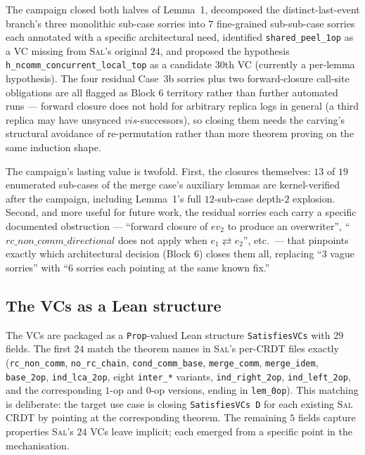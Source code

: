 \documentclass[11pt,a4paper]{article}
\theoremstyle{definition}
\theoremstyle{remark}
\newcommand{\ev}{\mathit{ev}}
\newcommand{\commute}{\mathrel{\rightleftarrows}}
\newcommand{\Sal}{\textsc{Sal}}
\begin{document}
The campaign closed both halves of Lemma~1, decomposed the
distinct-last-event branch's three monolithic sub-case sorries
into $7$ fine-grained sub-sub-case sorries each annotated with a
specific architectural need, identified \texttt{shared\_peel\_1op}
as a VC missing from \Sal{}'s original $24$, and proposed the
hypothesis \texttt{h\_ncomm\_concurrent\_local\_top} as a candidate
$30$th VC (currently a per-lemma hypothesis). The four residual
Case~3b sorries plus two forward-closure call-site obligations are
all flagged as Block 6 territory rather than further automated
runs --- forward closure does not hold for arbitrary replica logs
in general (a third replica may have unsynced
$\mathit{vis}$-successors), so closing them needs the carving's
structural avoidance of re-permutation rather than more theorem
proving on the same induction shape.

The campaign's lasting value is twofold. First, the closures
themselves: $13$ of $19$ enumerated sub-cases of the merge case's
auxiliary lemmas are kernel-verified after the campaign, including
Lemma~1's full $12$-sub-case depth-$2$ explosion. Second, and more
useful for future work, the residual sorries each carry a specific
documented obstruction --- ``forward closure of $\ev_2$ to produce
an overwriter'', ``$\mathit{rc\_non\_comm\_directional}$ does not
apply when $e_1 \commute e_2$'', etc.\ --- that pinpoints exactly
which architectural decision (Block 6) closes them all, replacing
``$3$ vague sorries'' with ``$6$ sorries each pointing at the same
known fix.''

\subsection{The VCs as a Lean structure}
\label{sec:satisfies-vcs}

The VCs are packaged as a \texttt{Prop}-valued Lean structure
\texttt{SatisfiesVCs} with $29$ fields. The first $24$
match the theorem names in \Sal{}'s per-CRDT files exactly
(\texttt{rc\_non\_comm}, \texttt{no\_rc\_chain},
\texttt{cond\_comm\_base}, \texttt{merge\_comm}, \texttt{merge\_idem},
\texttt{base\_2op}, \texttt{ind\_lca\_2op}, eight \texttt{inter\_*}
variants, \texttt{ind\_right\_2op}, \texttt{ind\_left\_2op}, and the
corresponding $1$-op and $0$-op versions, ending in
\texttt{lem\_0op}). This matching is deliberate: the target use
case is closing \texttt{SatisfiesVCs D} for each existing \Sal{}
CRDT by pointing at the corresponding theorem. The remaining $5$
fields capture properties \Sal{}'s $24$ VCs leave implicit;
each emerged from a specific point in the mechanisation.
\end{document}
